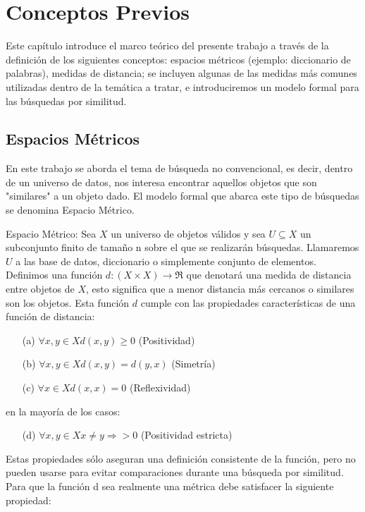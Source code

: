 \chapter{Conceptos Previos}

Este cap\'itulo introduce el marco te\'orico del presente trabajo a trav\'es de 
la definici\'on de los siguientes conceptos: espacios m\'etricos (ejemplo: diccionario de 
palabras), medidas de distancia; se incluyen algunas de las medidas m\'as comunes utilizadas 
dentro de la tem\'atica a tratar, e introduciremos un modelo formal para las b\'usquedas por 
similitud.

\section{Espacios M\'etricos}

En este trabajo se aborda el tema de b\'usqueda no convencional, es decir, dentro de un universo 
de datos, nos interesa encontrar aquellos objetos que son "similares" a un objeto dado. El modelo 
formal que abarca este tipo de b\'usquedas se denomina Espacio M\'etrico.

Espacio M\'etrico:
Sea $X$ un universo de objetos v\'alidos y sea $U \subseteq X$ un subconjunto finito de tama\~no n 
sobre el que se realizar\'an b\'usquedas. Llamaremos $U$ a las base de datos, diccionario o 
simplemente conjunto de elementos.
Definimos una funci\'on $d:(X \times X) \rightarrow \Re$ que denotar\'a una medida de distancia 
entre objetos de $X$, esto significa que a menor distancia m\'as cercanos o similares son los 
objetos. Esta funci\'on $d$ cumple con las propiedades caracter\'isticas de una funci\'on de 
distancia:


\begin{enumerate}
\item [(a)] $\forall x,y \in X d(x,y) \geq 0$ (Positividad)
\item [(b)] $\forall x,y \in X d(x,y) = d(y,x)$ (Simetr\'ia)
\item [(c)] $\forall x \in X d(x,x) = 0 $ (Reflexividad)
\end{enumerate}
en la mayor\'ia de los casos:
\begin{enumerate}
\item [(d)]  $\forall x,y \in X x \neq y \Rightarrow > 0$ (Positividad estricta)
\end{enumerate}


Estas propiedades s\'olo aseguran una definici\'on consistente de la funci\'on, pero no pueden 
usarse para evitar comparaciones durante una b\'usqueda por similitud. Para que la funci\'on d sea 
realmente una m\'etrica debe satisfacer la siguiente propiedad:

